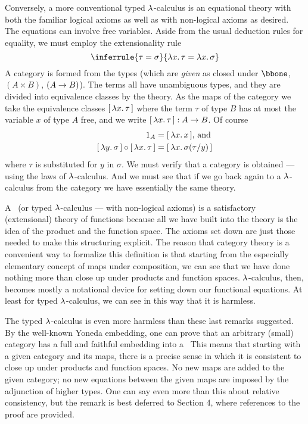 Conversely, a more conventional typed $\lambda$-calculus is an equational theory with both the
familiar logical axioms as well as with non-logical axioms as desired. The equations can
involve free variables. Aside from the usual deduction rules for equality, we must employ
the extensionality rule
$$
\inferrule
  {\tau = \sigma}
  {\l x .\, \tau = \l x .\, \sigma}
$$
%
A category is formed from the types (which are {\it given} as closed under $\bbone$, $(A
\times B)$, $(A \rightarrow B)$). The terms all have unambiguous types, and they are divided into
equivalence classes by the theory. As the maps of the category we take the equivalence
classes $\br{\lm{x}.\tau}$ where the term $\tau$ of type $B$ has at most the variable $x$
of type $A$ free, and we write $\br{\lm{x}.\tau} : \AB$. Of course
\begin{align*}
\id_A &= \br{\lm{x}.x}, \, \textrm{and}\\
\br{\lm{y}.\sigma} \comp \br{\lm{x}.\tau} &= \br{\lm{x}.\sigma(\tau/y)}
\end{align*}
where $\tau$ is substituted for $y$ in $\sigma$. We must verify that a category is
obtained --- using the laws of $\lambda$-calculus.  And we must see that if we go back again to
a $\lambda$-calculus from the category we have essentially the same theory.

A \ccc\ (or typed $\lambda$-calculus --- with non-logical axioms) is a satisfactory
(extensional) theory of functions because all we have built into the theory is the idea of
the product and the function space. The axioms set down are just those needed to make this
structuring explicit. The reason that category theory is a convenient way to formalize
this definition is that starting from the especially elementary concept of maps under
composition, we can see that we have done nothing more than close up under products and
function spaces. $\lambda$-calculus, then, becomes mostly a notational device for setting down
our functional equations. At least for typed $\lambda$-calculus, we can see in this way that it
is harmless.

The typed $\lambda$-calculus is even more harmless than these last remarks suggested. By the
well-known Yoneda embedding, one can prove that an arbitrary (small) category has a full
and faithful embedding into a \ccc\ This means that starting with a given category and its
maps, there is a precise sense in which it is consistent to close up under products and
function spaces. No new maps are added to the given category; no new equations between the
given maps are imposed by the adjunction of higher types. One can say even more than this
about relative consistency, but the remark is best deferred to Section 4, where references
to the proof are provided.

